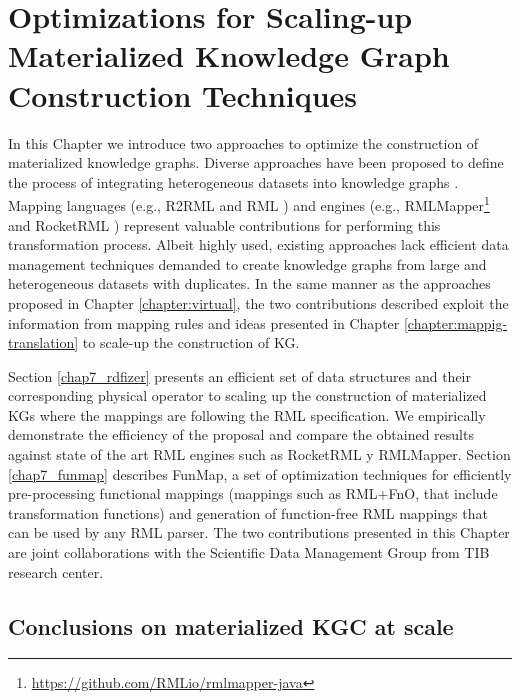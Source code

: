 
\chapter{Optimizations for Scaling-up Materialized Knowledge Graph Construction Techniques}
\label{chapter:construction}


In this Chapter we introduce two approaches to optimize the construction of materialized knowledge graphs. Diverse approaches have been proposed to define the process of integrating heterogeneous datasets into knowledge graphs \citep{chebotko2009semantics,calvanese2017ontop,chaves2019what,priyatna2014formalisation}. Mapping languages (e.g., R2RML \citep{R2RML} and RML \citep{dimou2014rml}) and engines (e.g., RMLMapper\footnote{\url{https://github.com/RMLio/rmlmapper-java}} and RocketRML \citep{csimcsek2019rocketrml}) represent valuable contributions for performing this transformation process. Albeit highly used, existing approaches lack efficient data management techniques demanded to create knowledge graphs from large and heterogeneous datasets with duplicates. In the same manner as the approaches proposed in Chapter \ref{chapter:virtual}, the two contributions described exploit the information from mapping rules and ideas presented in Chapter \ref{chapter:mappig-translation} to scale-up the construction of KG.

Section \ref{chap7_rdfizer} presents an efficient set of data structures and their corresponding physical operator to scaling up the construction of materialized KGs where the mappings are following the RML specification. We empirically demonstrate the efficiency of the proposal and compare the obtained results against state of the art RML engines such as RocketRML y RMLMapper. Section \ref{chap7_funmap} describes FunMap, a set of optimization techniques for efficiently pre-processing functional mappings (mappings such as RML+FnO, that include transformation functions) and generation of function-free RML mappings that can be used by any RML parser. The two contributions presented in this Chapter are joint collaborations with the Scientific Data Management Group from TIB research center.








\section{Conclusions on materialized KGC at scale}